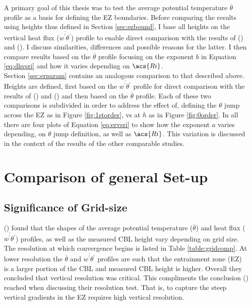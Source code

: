 A primary goal of this thesis was to test the average potential temperature $\overline{\theta}$ profile as a basis for defining the \acs{EZ} boundaries.  Before comparing the results using heights thus defined in Section \ref{sec:ezbound}, I base all heights on the vertical heat flux ($\overline{w^{'}\theta^{'}}$) profile to enable direct comparison with the results of \citeauthor{BrooksFowler2} (\citeyear{BrooksFowler2}) and \citeauthor{FedConzMir04} (\citeyear{FedConzMir04}).  I discuss similarities, differences and possible reasons for the latter. I then compare results based on the $\overline{\theta}$ profile focusing on the exponent $b$ in Equation \ref{eq:dhvsri} and how it varies depending on $\acs{Ri}$.\\


Section \ref{sec:erparam} contains an analogous comparison to that described above.  Heights are defined, first based on the $\overline{w^{'}\theta^{'}}$ profile for direct comparison with the results of \citeauthor{FedConzMir04} (\citeyear{FedConzMir04}) and \citeauthor{GarciaMellado} (\citeyear{GarciaMellado}) and then based on the $\overline{\theta}$ profile.  Each of these two comparisons is subdivided in order to address the effect of, defining the $\theta$ jump across the \acs{EZ} as in Figure \ref{fig:1storder}, vs at $h$ as in Figure \ref{fig:0order}.  In all there are four plots of Equation \ref{eq:ervsri} to show how the exponent $a$ varies depending, on $\theta$ jump definition, as well as $\acs{Ri}$.  This variation is discussed in the context of the results of the other comparable studies.\\          

\section{Comparison of general Set-up}
\label{sec:gensetup}
\FloatBarrier

\subsection{Significance of Grid-size}
\label{subsec:gridsize}
\citeauthor{SullPat} (\citeyear{SullPat}) found that the shapes of the average potential temperature ($\overline{\theta}$) and heat flux ($\overline{w^{'}\theta^{'}}$) profiles, as well as the measured \acs{CBL} height vary depending on grid size.  The resolution at which convergence begins is listed in Table \ref{table:gridcomp}.  At lower resolution the $\overline{\theta}$ and $\overline{w^{'}\theta^{'}}$ profiles are such that the entrainment zone (\acs{EZ}) is a larger portion of the \acs{CBL} and measured \acs{CBL} height is higher.  Overall they concluded that vertical resolution was critical.  This compliments the conclusion \citeauthor{BrooksFowler2} (\citeyear{BrooksFowler2}) reached when discussing their resolution test.  That is, to capture the steep vertical gradients in the \acs{EZ} requires high vertical resolution. \\

